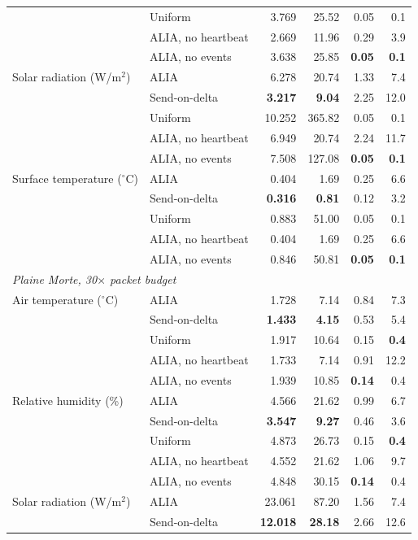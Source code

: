 \begin{tabular}{llrrrr}
 & Uniform & 3.769 & 25.52 & 0.05 & 0.1 \\
 & ALIA, no heartbeat & 2.669 & 11.96 & 0.29 & 3.9 \\
 & ALIA, no events & 3.638 & 25.85 & \textbf{0.05} & \textbf{0.1} \\
Solar radiation (W/m$^2$) & ALIA & 6.278 & 20.74 & 1.33 & 7.4 \\
 & Send-on-delta & \textbf{3.217} & \textbf{9.04} & 2.25 & 12.0 \\
 & Uniform & 10.252 & 365.82 & 0.05 & 0.1 \\
 & ALIA, no heartbeat & 6.949 & 20.74 & 2.24 & 11.7 \\
 & ALIA, no events & 7.508 & 127.08 & \textbf{0.05} & \textbf{0.1} \\
Surface temperature ($^\circ$C) & ALIA & 0.404 & 1.69 & 0.25 & 6.6 \\
 & Send-on-delta & \textbf{0.316} & \textbf{0.81} & 0.12 & 3.2 \\
 & Uniform & 0.883 & 51.00 & 0.05 & 0.1 \\
 & ALIA, no heartbeat & 0.404 & 1.69 & 0.25 & 6.6 \\
 & ALIA, no events & 0.846 & 50.81 & \textbf{0.05} & \textbf{0.1} \\
\midrule
\multicolumn{6}{l}{\emph{Plaine Morte, 30$\times$ packet budget}} \\
Air temperature ($^\circ$C) & ALIA & 1.728 & 7.14 & 0.84 & 7.3 \\
 & Send-on-delta & \textbf{1.433} & \textbf{4.15} & 0.53 & 5.4 \\
 & Uniform & 1.917 & 10.64 & 0.15 & \textbf{0.4} \\
 & ALIA, no heartbeat & 1.733 & 7.14 & 0.91 & 12.2 \\
 & ALIA, no events & 1.939 & 10.85 & \textbf{0.14} & 0.4 \\
Relative humidity (\%) & ALIA & 4.566 & 21.62 & 0.99 & 6.7 \\
 & Send-on-delta & \textbf{3.547} & \textbf{9.27} & 0.46 & 3.6 \\
 & Uniform & 4.873 & 26.73 & 0.15 & \textbf{0.4} \\
 & ALIA, no heartbeat & 4.552 & 21.62 & 1.06 & 9.7 \\
 & ALIA, no events & 4.848 & 30.15 & \textbf{0.14} & 0.4 \\
Solar radiation (W/m$^2$) & ALIA & 23.061 & 87.20 & 1.56 & 7.4 \\
 & Send-on-delta & \textbf{12.018} & \textbf{28.18} & 2.66 & 12.6 \\

\end{tabular}
